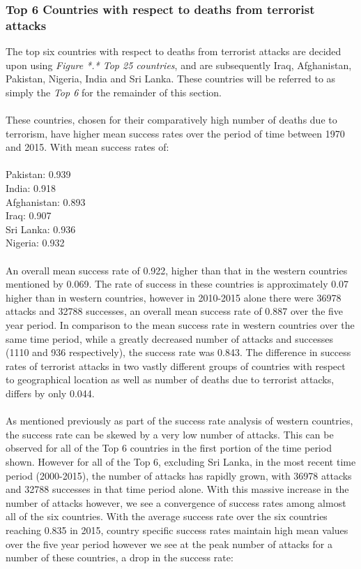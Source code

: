 \documentclass[10pt,a4paper]{article}
\begin{document}
\subsubsection{Top 6 Countries with respect to deaths from terrorist attacks}
The top six countries with respect to deaths from terrorist attacks are decided upon using \textit{Figure *.* Top 25 countries}, and are subsequently Iraq, Afghanistan, Pakistan, Nigeria, India and Sri Lanka. These countries will be referred to as simply the \textit{Top 6} for the remainder of this section.
\\\\
These countries, chosen for their comparatively high number of deaths due to terrorism, have higher mean success rates over the period of time between 1970 and 2015. With mean success rates of:
\\\\ 
\indent Pakistan: 0.939\\
\indent India: 0.918\\
\indent Afghanistan: 0.893\\
\indent Iraq: 0.907\\
\indent Sri Lanka: 0.936\\
\indent Nigeria: 0.932\\
\\
An overall mean success rate of 0.922, higher than that in the western countries mentioned by 0.069. The rate of success in these countries is approximately 0.07 higher than in western countries, however in 2010-2015 alone there were 36978 attacks and 32788 successes, an overall mean success rate of 0.887 over the five year period. In comparison to the mean success rate in western countries over the same time period, while a greatly decreased number of attacks and successes (1110 and 936 respectively), the success rate was 0.843. The difference in success rates of terrorist attacks in two vastly different groups of countries with respect to geographical location as well as number of deaths due to terrorist attacks, differs by only 0.044.
\\\\
As mentioned previously as part of the success rate analysis of western countries, the success rate can be skewed by a very low number of attacks. This can be observed for all of the Top 6 countries in the first portion of the time period shown. However for all of the Top 6, excluding Sri Lanka, in the most recent time period (2000-2015), the number of attacks has rapidly grown, with 36978 attacks and 32788 successes in that time period alone. With this massive increase in the number of attacks however, we see a convergence of success rates among almost all of the six countries. With the average success rate over the six countries reaching 0.835 in 2015, country specific success rates maintain high mean values over the five year period however we see at the peak number of attacks for a number of these countries, a drop in the success rate:
\end{document}

